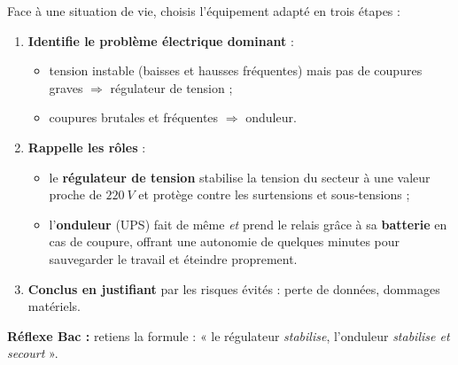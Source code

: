 \documentclass[11pt]{article}
\newcommand{\cle}[1]{{\popxbold\color{popdark}#1}}
\begin{document}
\begin{methode}
Face à une situation de vie, choisis l'équipement adapté en trois étapes :
\begin{enumerate}
\item \textbf{Identifie le problème électrique dominant} :
\begin{itemize}
\item tension instable (baisses et hausses fréquentes) mais pas de coupures graves $\Rightarrow$ \cle{régulateur de tension} ;
\item coupures brutales et fréquentes $\Rightarrow$ \cle{onduleur}.
\end{itemize}
\item \textbf{Rappelle les rôles} :
\begin{itemize}
\item le \textbf{régulateur de tension} stabilise la tension du secteur à une valeur proche de $\SI{220}{V}$ et protège contre les surtensions et sous-tensions ;
\item l'\textbf{onduleur} (UPS) fait de même \emph{et} prend le relais grâce à sa \textbf{batterie} en cas de coupure, offrant une \cle{autonomie} de quelques minutes pour sauvegarder le travail et éteindre proprement.
\end{itemize}
\item \textbf{Conclus en justifiant} par les risques évités : perte de données, dommages matériels.
\end{enumerate}
\textbf{Réflexe Bac :} retiens la formule : « le régulateur \emph{stabilise}, l'onduleur \emph{stabilise et secourt} ».
\end{methode}
\end{document}
